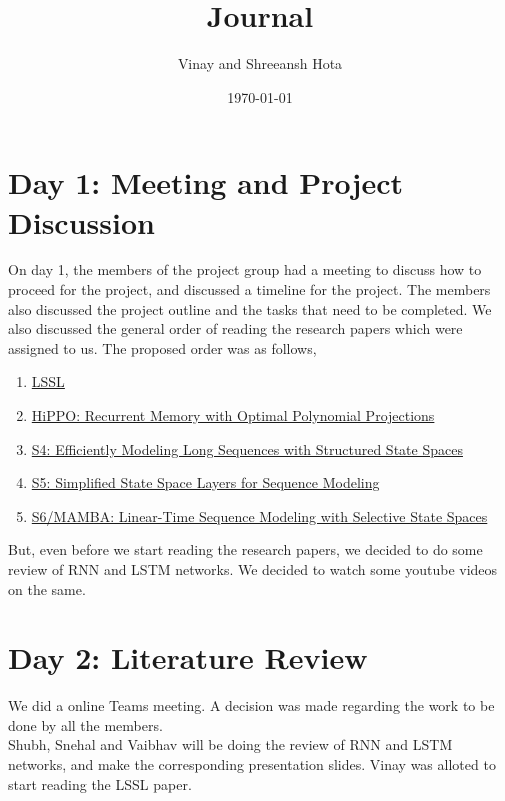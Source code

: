 \documentclass[11pt]{scrartcl}
\title{Journal}
\author{Vinay and Shreeansh Hota}
\date{\today}
\begin{document}
\maketitle

\tableofcontents

\section{Day 1: Meeting and Project Discussion}

On day 1, the members of the project group had a meeting to discuss how to proceed for the project, and discussed a timeline for the project. The members also discussed the project outline and the tasks that need to be completed. We also discussed the general order of reading the research papers which were assigned to us. The proposed order was as follows,

\begin{enumerate}
    \item \href{https://arxiv.org/pdf/2110.13985}{LSSL}
    \item \href{https://arxiv.org/pdf/2008.07669}{HiPPO: Recurrent Memory with Optimal Polynomial Projections}
    \item \href{https://arxiv.org/pdf/2111.00396}{S4: Efficiently Modeling Long Sequences with Structured State Spaces}
    \item \href{https://arxiv.org/pdf/2208.04933}{S5: Simplified State Space Layers for Sequence Modeling}
    \item \href{https://arxiv.org/pdf/2312.00752}{S6/MAMBA: Linear-Time Sequence Modeling with Selective State Spaces}
\end{enumerate}

But, even before we start reading the research papers, we decided to do some review of RNN and LSTM networks. We decided to watch some youtube videos on the same.

\section{Day 2: Literature Review}
We did a online Teams meeting. A decision was made regarding the work to be done by all the members.\\

Shubh, Snehal and Vaibhav will be doing the review of RNN and LSTM networks, and make the corresponding presentation slides. Vinay was alloted to start reading the LSSL paper. \\
\end{document}
